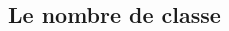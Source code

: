 \documentclass[a4paper]{article}
\begin{document}
\begin{multicols}{2}
        \subsection{Le nombre de classe}


                    


\end{multicols}
\end{document}

